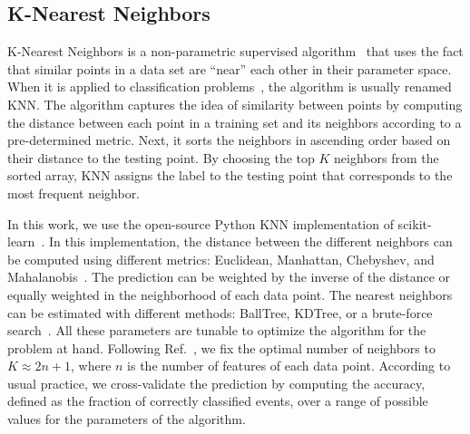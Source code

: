 \subsection*{K-Nearest Neighbors}

K-Nearest Neighbors is a non-parametric supervised algorithm~\cite{Fix:1951,Cover:1967} that uses the fact that similar points in a data set are ``near'' each other in their
parameter space. When it is applied to classification problems~\cite{Guo:2004}, the algorithm is usually renamed \ac{KNN}. The algorithm captures the idea of similarity between
points by computing the distance between each point in a training set and its neighbors according to a pre-determined metric. Next, it sorts the neighbors in ascending order based on
their distance to the testing point. By choosing the top $K$ neighbors from the sorted array, \ac{KNN} assigns the label to the testing point that corresponds to the most
frequent neighbor.

In this work, we use the open-source Python \ac{KNN} implementation of scikit-learn~\cite{Pedregosa:2011ork}. In this implementation, the distance between the different neighbors can be
computed using different metrics: Euclidean, Manhattan, Chebyshev, and Mahalanobis~\cite{ADictionaryofStatistics}. The prediction can be weighted by the inverse of the distance or equally
weighted in the neighborhood of each data point. The nearest neighbors can be estimated with different methods: BallTree, KDTree, or a brute-force search~\cite{Bentley1975,Omohundro1989}. All these parameters are tunable to optimize the algorithm for the problem at hand. Following Ref.~\cite{Chatterjee:2019avs}, we fix the optimal number of neighbors to $K \approx 2n+1$,
where $n$ is the number of features of each data point. According to usual practice, we cross-validate the prediction by computing the accuracy, defined as the fraction of correctly classified events, over a range of possible values for the parameters of the algorithm.
